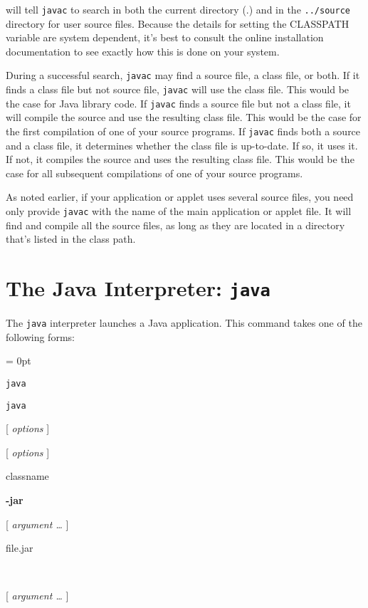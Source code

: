 \noindent will tell {\tt javac} to search in both the current directory (.)
and in the {\tt ../source} directory for user source files. Because the
details for setting the CLASSPATH variable are system dependent, it's best to
consult the online installation documentation to see exactly how this is done on
your system.

During a successful search, {\tt javac} may find a source file, a
class file, or both.   If it finds a class file but not source file,
{\tt javac} will use the class file.  This would be the case for Java
library code.  If {\tt javac} finds a source file but not a class file,
it will compile the source and use the resulting class file.  This
would be the case for the first compilation of one of your source
programs.   If {\tt javac} finds both a source and a class file, it
determines whether the class file is up-to-date.  If so, it uses it.  If
not, it compiles the source and uses the resulting class file.  This
would be the case for all subsequent compilations of one of your
source programs.

As noted earlier, if your application or applet uses several source
files, you need only provide {\tt javac} with the name of the main
application or applet file.   It will find and compile all the source
files, as long as they are located in a directory that's listed in the
class path.

\section*{The Java Interpreter: {\tt java}}
\label{the-java-interpreter}
\noindent The {\tt java} interpreter launches a Java application.   This command
takes one of the following forms:

\vspace{6pt plus3pt minus2pt}\columnsep = 0pt\begin{multicols}{5}
\small
\parindent=0pc
{\tt java} 

{\tt java} 

 [ {\it options} ] 

 [ {\it options} ] 

 classname 

 {\bf -jar} 

 [ {\it argument \dots } ] 

 file.jar 

\mbox{ }

 [ {\it argument \dots } ]
\end{multicols}

